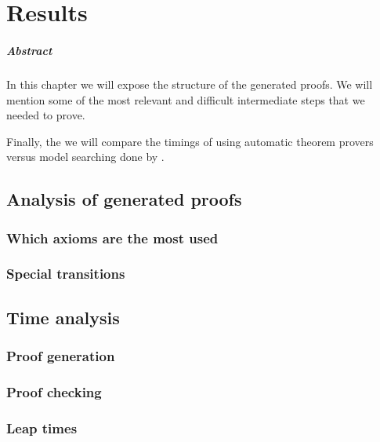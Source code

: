 \chapter{Results\label{chap:results}}

\paragraph{Abstract} In this chapter we will expose the structure of the generated proofs. We will mention some of the most relevant and difficult intermediate steps that we needed to prove.

Finally, the we will compare the timings of using automatic theorem provers versus model searching done by .

\section{Analysis of generated proofs}
\label{sec:axiomgraph}

\subsection{Which axioms are the most used}

\subsection{Special transitions}

\section{Time analysis}
\label{sec:timeanalysis}

\subsection{Proof generation}

\subsection{Proof checking}

\subsection{Leap times}
